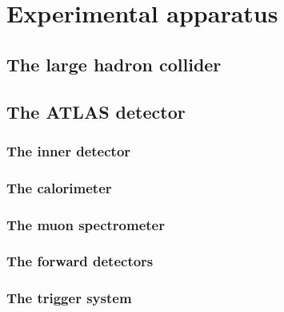\documentclass[10pt,twoside,cucitura,classica,english,openany]{toptesi}
\begin{document}


\chapter{Experimental apparatus}
\label{cha:exper-appar}

\section{The large hadron collider}
\label{sec:large-hadr-coll}



\section{The ATLAS detector}
\label{sec:atlas-detector}



\subsection{The inner detector}
\label{sec:inner-detector}



\subsection{The calorimeter}
\label{sec:calorimeters}



\subsection{The muon spectrometer}
\label{sec:muon-spectrometer}



\subsection{The forward detectors}
\label{sec:forward-detectors}



\subsection{The trigger system}
\label{sec:trigger-system}
\end{document}
